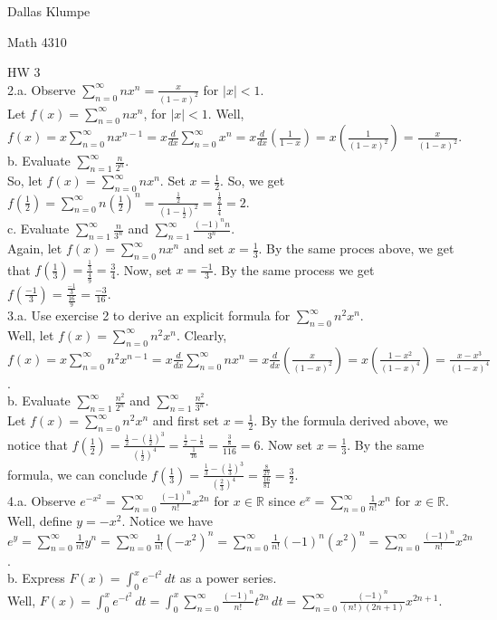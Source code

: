 \documentclass[12pt]{article}
\begin{document}
\noindent Dallas Klumpe

\noindent Math 4310

\noindent HW 3\\

2.a. Observe $\sum_{n=0}^{\infty}nx^n=\frac{x}{(1-x)^2}$ for $|x|<1$.\\
Let $f(x)=\sum_{n=0}^{\infty}nx^n$, for $|x|<1$. Well, $f(x)=x\sum_{n=0}^{\infty}nx^{n-1}=x\frac{d}{dx}\sum_{n=0}^{\infty}x^n=x\frac{d}{dx}(\frac{1}{1-x})=x(\frac{1}{(1-x)^2})=\frac{x}{(1-x)^2}$.\\
b. Evaluate $\sum_{n=1}^{\infty}\frac{n}{2^n}$.\\
So, let $f(x)=\sum_{n=0}^{\infty}nx^n$. Set $x=\frac12$. So, we get $f(\frac12)=\sum_{n=0}^{\infty}n(\frac12)^n=\frac{\frac12}{(1-\frac12)^2}=\frac{\frac12}{\frac14}=2$.\\
c. Evaluate $\sum_{n=1}^{\infty}\frac{n}{3^n}$ and $\sum_{n=1}^{\infty}\frac{(-1)^nn}{3^n}$.\\
Again, let $f(x)=\sum_{n=0}^{\infty}nx^n$ and set $x=\frac13$. By the same proces above, we get that $f(\frac13)=\frac{\frac13}{\frac49}=\frac34$. Now, set $x=\frac{-1}{3}$. By the same process we get $f(\frac{-1}{3})=\frac{\frac{-1}{3}}{\frac{16}{9}}=\frac{-3}{16}$.\\

3.a. Use exercise 2 to derive an explicit formula for $\sum_{n=0}^{\infty}n^2x^n$.\\
Well, let $f(x)=\sum_{n=0}^{\infty}n^2x^n$. Clearly, $f(x)=x\sum_{n=0}^{\infty}n^2x^{n-1}=x\frac{d}{dx}\sum_{n=0}^{\infty}nx^n=x\frac{d}{dx}(\frac{x}{(1-x)^2})=x(\frac{1-x^2}{(1-x)^4})=\frac{x-x^3}{(1-x)^4}$.\\
b. Evaluate $\sum_{n=1}^{\infty}\frac{n^2}{2^n}$ and $\sum_{n=1}^{\infty}\frac{n^2}{3^n}$.\\
Let $f(x)=\sum_{n=0}^{\infty}n^2x^n$ and first set $x=\frac12$. By the formula derived above, we notice that $f(\frac12)=\frac{\frac12-(\frac12)^3}{(\frac12)^4}=\frac{\frac12-\frac18}{\frac{1}{16}}=\frac{\frac38}{{1}{16}}=6$. Now set $x=\frac13$. By the same formula, we can conclude $f(\frac13)=\frac{\frac13-(\frac13)^3}{(\frac23)^4}=\frac{\frac{8}{27}}{\frac{16}{81}}=\frac32$.\\

4.a. Observe $e^{-x^2}=\sum_{n=0}^{\infty}\frac{(-1)^n}{n!}x^{2n}$ for $x\in\mathbb{R}$ since $e^x=\sum_{n=0}^{\infty}\frac{1}{n!}x^{n}$ for $x\in\mathbb{R}$.\\
Well, define $y=-x^2$. Notice we have $e^y=\sum_{n=0}^{\infty}\frac{1}{n!}y^{n}=\sum_{n=0}^{\infty}\frac{1}{n!}(-x^2)^{n}=\sum_{n=0}^{\infty}\frac{1}{n!}(-1)^n(x^2)^{n}=\sum_{n=0}^{\infty}\frac{(-1)^n}{n!}x^{2n}$.\\
b. Express $F(x)=\int_{0}^{x} e^{-t^2} \,dt$ as a power series.\\
Well, $F(x)=\int_{0}^{x} e^{-t^2} \,dt=\int_{0}^{x}\sum_{n=0}^{\infty}\frac{(-1)^n}{n!}t^{2n}\,dt=\sum_{n=0}^{\infty}\frac{(-1)^n}{(n!)(2n+1)}x^{2n+1}$.\\
\end{document}

